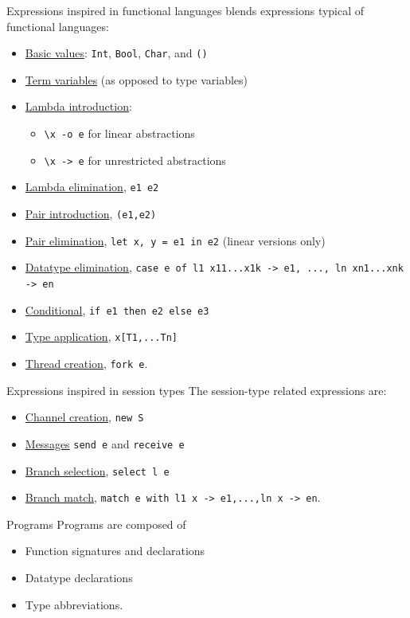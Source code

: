 \documentclass[10pt]{beamer}
\begin{document}
\begin{frame}{Expressions {\small \color{mLightBrown}inspired in functional languages}}
\freest{} blends expressions typical of functional languages:
\begin{itemize}
\item \underline{Basic values}: \lstinline|Int|,
  \lstinline|Bool|, \lstinline|Char|, and \lstinline|()|
\item \underline{Term variables} (as opposed to type variables)
\item \underline{Lambda introduction}: 
\begin{itemize}
	\item \lstinline|\x -o e| for linear abstractions
	\item \lstinline|\x -> e| for unrestricted abstractions
\end{itemize}
\item \underline{Lambda elimination}, \lstinline|e1 e2|
\item \underline{Pair introduction}, \lstinline|(e1,e2)| 
\item \underline{Pair elimination},
  \lstinline|let x, y = e1 in e2| (linear versions only)
\item \underline{Datatype elimination},
  \lstinline|case e of l1 x11...x1k -> e1, ..., ln xn1...xnk -> en|
\item \underline{Conditional}, \lstinline|if e1 then e2 else e3|
\item \underline{Type application}, \lstinline|x[T1,...Tn]|
\item \underline{Thread creation}, \lstinline|fork e|.
\end{itemize}
\end{frame}

\begin{frame}{Expressions {\small \color{mLightBrown}inspired in session types}}
The session-type related expressions are:
\begin{itemize}
\item \underline{Channel creation}, \lstinline|new S|
\item \underline{Messages} \lstinline|send e| and
  \lstinline|receive e|
\item \underline{Branch selection}, \lstinline|select l e|
\item \underline{Branch match},
  \lstinline|match e with l1 x -> e1,...,ln x -> en|.
\end{itemize}
\end{frame}

\begin{frame}{Programs}
Programs are composed of
%
\begin{itemize}
\item Function signatures and
  declarations
\item Datatype declarations
\item Type abbreviations.
\end{itemize}
\end{frame}
\end{document}

